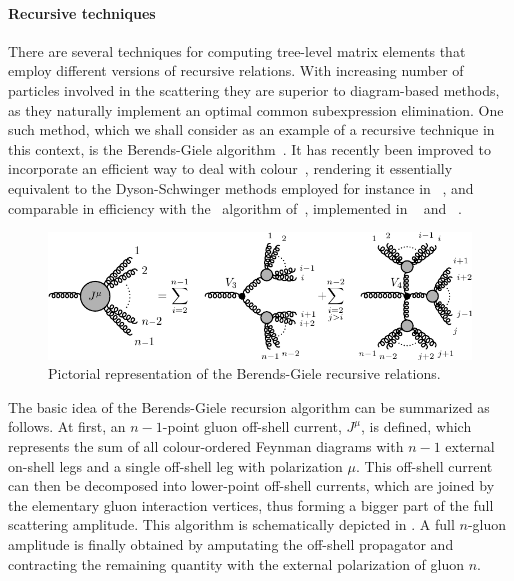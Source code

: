 \paragraph{Recursive techniques} 
There are several techniques for computing tree-level matrix elements that employ 
different versions of recursive relations. With increasing number of particles 
involved in the scattering they are superior to diagram-based methods,
as they naturally implement an optimal common subexpression elimination.
One such method, which we shall consider as an example of a recursive 
technique in this context, is the Berends-Giele algorithm~\cite{Berends:1987me,
  Berends:1987cv,Kleiss:1988ne,Berends:1988yn,Berends:1989ie}.
It has recently been improved to incorporate an efficient way
to deal with colour~\cite{Duhr:2006iq}, rendering it essentially equivalent 
to the Dyson-Schwinger methods employed for instance in 
\Helac~\cite{Draggiotis:2002hm}, and comparable in efficiency with the 
\ALPHA\ algorithm of~\cite{Caravaglios:1995cd}, implemented in 
\Alpgen~\cite{Mangano:2002ea} and \OmegaCode~\cite{Moretti:2001zz}. 
 
\begin{figure}[t]\begin{center}
  \includegraphics[width=\textwidth]{appendix/matrix-elements/bgrr.pdf}
  \end{center}
  \caption{Pictorial representation of the Berends-Giele 
  recursive relations.\label{fig:BG}}
\end{figure}
The basic idea of the Berends-Giele recursion algorithm can be summarized as 
follows. At first, an $n-1$-point gluon 
off-shell current, $ J^\mu$, is defined, which represents the sum 
of all colour-ordered Feynman diagrams with $n-1$ external on-shell legs 
and a single off-shell leg with polarization $\mu$.  This off-shell current 
can then be decomposed into lower-point off-shell currents, which are joined 
by the elementary gluon interaction vertices, thus forming a bigger part of
the full scattering amplitude. This algorithm is schematically depicted in 
.  A full $n$-gluon amplitude is finally obtained by 
amputating the off-shell propagator and contracting the remaining quantity 
with the external polarization of gluon $n$.  

